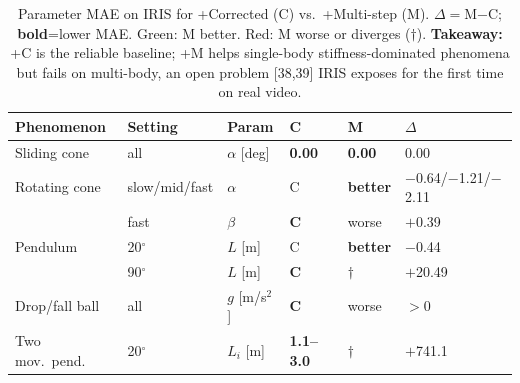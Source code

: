 \documentclass[10pt,twocolumn,letterpaper]{article}
\newcommand{\cgr}{\cellcolor{cgreen}}
\newcommand{\crd}{\cellcolor{cred}}
\newcommand{\method}{IRIS}
\begin{document}
\begin{table}[t]
\vspace{-7pt}
\centering
\setlength{\tabcolsep}{2pt}
\renewcommand{\arraystretch}{0.9}
\scriptsize
\caption{\scriptsize Parameter MAE on \method{} for +Corrected (C) vs.\ +Multi-step (M). $\Delta{=}$M$-$C; \textbf{bold}=lower MAE. \colorbox{cgreen}{Green}: M better. \colorbox{cred}{Red}: M worse or diverges ($\dagger$). \textbf{Takeaway:} +C is the reliable baseline; +M helps single-body stiffness-dominated phenomena but fails on multi-body, an open problem [38,39] \method{} exposes for the first time on real video.}
\label{tab:iris_primary}
\begin{tabular}{llllll}
\toprule
Phenomenon & Setting & Param & C & M & $\Delta$ \\
\midrule
Sliding cone   & all     & $\alpha$ [deg] & \textbf{0.00} & \textbf{0.00} & 0.00 \\
Rotating cone  & slow/mid/fast & $\alpha$ & C & \cgr \textbf{better} & \cgr $-$0.64/$-$1.21/$-$2.11 \\
               & fast    & $\beta$        & \textbf{C} & \crd worse        & \crd $+$0.39 \\
Pendulum       & 20$^\circ$ & $L$ [m]     & C     & \cgr \textbf{better} & \cgr $-$0.44 \\
               & 90$^\circ$ & $L$ [m]     & \textbf{C} & \crd $\dagger$    & \crd $+$20.49 \\
Drop/fall ball & all     & $g$ [m/s$^2$]  & \textbf{C} & \crd worse        & \crd $>$0    \\
Two mov.\ pend.& 20$^\circ$ & $L_i$ [m]   & \textbf{1.1--3.0} & \crd $\dagger$ & \crd $+$741.1 \\
\bottomrule
\end{tabular}
\vspace{-10pt}
\end{table}
\end{document}
